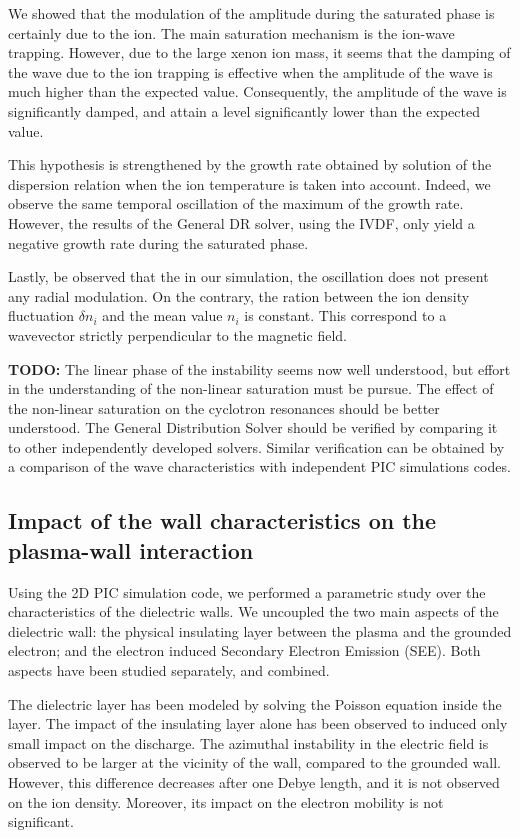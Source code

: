 We showed that the modulation of the amplitude during the saturated phase is certainly due to the ion.
The main saturation mechanism is the ion-wave trapping.
However, due to the large xenon ion mass, it seems that the damping of the wave due to the ion trapping is effective when the amplitude of the wave is much higher than the expected value.
Consequently, the amplitude of the wave is significantly damped, and attain a level significantly lower than the expected value.

This hypothesis is strengthened by the growth rate obtained by solution of the dispersion relation when the ion temperature is taken into account.
Indeed, we observe the same temporal oscillation of the maximum of the  growth rate.
However, the results of the General DR solver, using the IVDF, only yield a negative growth rate during the saturated phase.

Lastly, be observed that the in our simulation, the oscillation does not present any radial modulation.
On the contrary, the ration between the ion density fluctuation $\delta n_i$ and the mean value $n_i$ is constant. 
This correspond to a wavevector strictly perpendicular to the magnetic field.

{\bf TODO:} The linear phase of the instability seems now well understood, but effort in the understanding of the non-linear saturation must be pursue.
The effect of the non-linear saturation on the cyclotron resonances should be better understood.
The General Distribution Solver should be verified by comparing it to other independently developed solvers.
Similar verification can be obtained by a comparison of the wave characteristics with independent PIC simulations codes.

\subsection{Impact of the wall characteristics on the plasma-wall interaction }
Using the 2D PIC simulation code, we performed a parametric study over the characteristics of the dielectric walls.
We uncoupled the two main aspects of the dielectric wall\string: the physical insulating layer between the plasma and the grounded electron; and the electron induced Secondary Electron Emission (SEE).
Both aspects have been studied separately, and combined.

The dielectric layer has been modeled by solving the Poisson equation inside the layer.
The impact of the insulating layer alone has been observed to induced only small impact on the discharge.
The azimuthal instability in the electric field is observed to be larger at the vicinity of the wall, compared to the grounded wall.
However, this difference decreases after one Debye length, and it is not observed on the ion density.
Moreover, its impact on the electron mobility is not significant.

